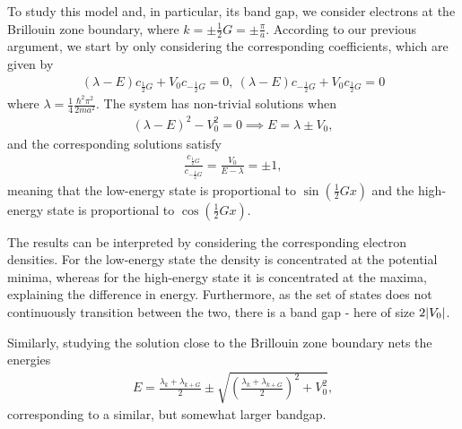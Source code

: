 To study this model and, in particular, its band gap, we consider electrons at the Brillouin zone boundary, where $k = \pm\frac{1}{2}G = \pm\frac{\pi}{a}$. According to our previous argument, we start by only considering the corresponding coefficients, which are given by
\begin{align*}
	\left(\lambda - E\right)c_{\frac{1}{2}G} + V_{0}c_{-\frac{1}{2}G} = 0,\ \left(\lambda - E\right)c_{-\frac{1}{2}G} + V_{0}c_{\frac{1}{2}G} = 0
\end{align*}
where $\lambda = \frac{1}{4}\frac{\hbar^{2}\pi^{2}}{2ma^{2}}$. The system has non-trivial solutions when
\begin{align*}
	\left(\lambda - E\right)^{2} - V_{0}^{2} = 0\implies E = \lambda \pm V_{0},
\end{align*}
and the corresponding solutions satisfy
\begin{align*}
	\frac{c_{\frac{1}{2}G}}{c_{-\frac{1}{2}G}} = \frac{V_{0}}{E - \lambda} = \pm 1,
\end{align*}
meaning that the low-energy state is proportional to $\sin(\frac{1}{2}Gx)$ and the high-energy state is proportional to $\cos(\frac{1}{2}Gx)$.

The results can be interpreted by considering the corresponding electron densities. For the low-energy state the density is concentrated at the potential minima, whereas for the high-energy state it is concentrated at the maxima, explaining the difference in energy. Furthermore, as the set of states does not continuously transition between the two, there is a band gap - here of size $2\abs{V_{0}}$.

Similarly, studying the solution close to the Brillouin zone boundary nets the energies
\begin{align*}
	E = \frac{\lambda_{k} + \lambda_{k + G}}{2} \pm\sqrt{\left(\frac{\lambda_{k} + \lambda_{k + G}}{2}\right)^{2} + V_{0}^{2}},
\end{align*}
corresponding to a similar, but somewhat larger bandgap.